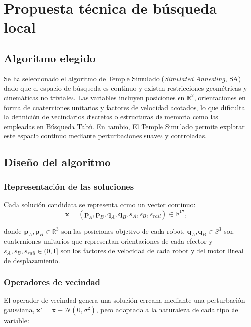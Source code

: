 \newpage
{}
\section*{Propuesta técnica de búsqueda local}

\subsection*{Algoritmo elegido}

Se ha seleccionado el algoritmo de Temple Simulado (\textit{Simulated Annealing}, SA) 
dado que el espacio de búsqueda es continuo y existen restricciones geométricas 
y cinemáticas no triviales. Las variables incluyen posiciones en $\mathbb{R}^3$, orientaciones en forma de cuaterniones unitarios
y factores de velocidad acotados, lo que dificulta la definición de vecindarios discretos o estructuras
de memoria como las empleadas en Búsqueda Tabú. En cambio, El Temple Simulado permite explorar este espacio
continuo mediante perturbaciones suaves y controladas.

\subsection*{Diseño del algoritmo}

\subsubsection*{Representación de las soluciones}
Cada solución candidata se representa como un vector continuo:
\[
\mathbf{x} =
(\mathbf{p}_A,\mathbf{p}_B,
\mathbf{q}_A,\mathbf{q}_B,
s_A,s_B,s_{rail})
\in \mathbb{R}^{17},
\]

donde $\mathbf{p}_A, \mathbf{p}_B \in \mathbb{R}^3$ son las posiciones objetivo de cada robot,
$\mathbf{q}_A, \mathbf{q}_B \in S^3$ son cuaterniones unitarios que representan orientaciones de cada efector y
$s_A, s_B, s_{rail} \in (0,1]$ son los factores de velocidad de cada robot y del motor lineal de desplazamiento.

\subsubsection*{Operadores de vecindad}
El operador de vecindad genera una solución cercana mediante una perturbación gaussiana,
$\mathbf{x}' = \mathbf{x} + \mathcal{N}(0,\sigma^2)$, pero adaptada a la naturaleza de cada 
tipo de variable:

